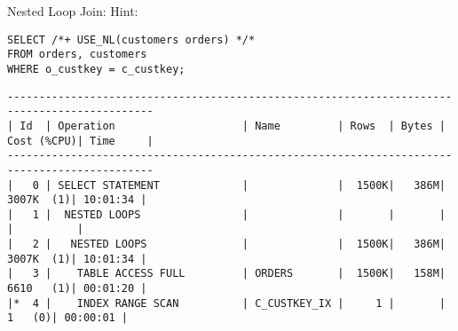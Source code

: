 \documentclass[11pt,a4paper,parskip=half]{scrartcl}
\begin{document}
Nested Loop Join:
Hint:
\begin{lstlisting}
SELECT /*+ USE_NL(customers orders) */*
FROM orders, customers
WHERE o_custkey = c_custkey;
\end{lstlisting}
\begin{lstlisting}
---------------------------------------------------------------------------------------------                                                                                                                                                                                                                
| Id  | Operation                    | Name         | Rows  | Bytes | Cost (%CPU)| Time     |                                                                                                                                                                                                                
---------------------------------------------------------------------------------------------                                                                                                                                                                                                                
|   0 | SELECT STATEMENT             |              |  1500K|   386M|  3007K  (1)| 10:01:34 |                                                                                                                                                                                                                
|   1 |  NESTED LOOPS                |              |       |       |            |          |                                                                                                                                                                                                                
|   2 |   NESTED LOOPS               |              |  1500K|   386M|  3007K  (1)| 10:01:34 |                                                                                                                                                                                                                
|   3 |    TABLE ACCESS FULL         | ORDERS       |  1500K|   158M|  6610   (1)| 00:01:20 |                                                                                                                                                                                                                
|*  4 |    INDEX RANGE SCAN          | C_CUSTKEY_IX |     1 |       |     1   (0)| 00:00:01 |                                                                                                                                                                                                                

\end{lstlisting}
\end{document}
